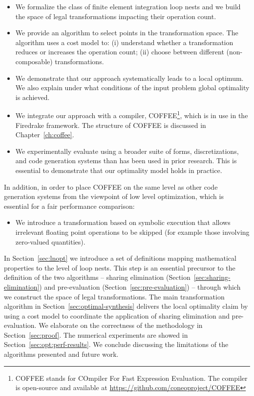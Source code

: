\begin{itemize}
\item We formalize the class of finite element integration loop nests and we build the space of legal transformations impacting their operation count.
\item We provide an algorithm to select points in the transformation space. The algorithm uses a cost model to: (i) understand whether a transformation reduces or increases the operation count; (ii) choose between different (non-composable) transformations.
\item We demonstrate that our approach systematically leads to a local optimum. We also explain under what conditions of the input problem global optimality is achieved.
\item We integrate our approach with a compiler, COFFEE\footnote{COFFEE stands for COmpiler For Fast Expression Evaluation. The compiler is open-source and available at \url{https://github.com/coneoproject/COFFEE}}, which is in use in the Firedrake framework. The structure of COFFEE is discussed in Chapter~\ref{ch:coffee}.
\item We experimentally evaluate using a broader suite of forms, discretizations, and code generation systems than has been used in prior research. This is essential to demonstrate that our optimality model holds in practice.
\end{itemize}

In addition, in order to place COFFEE on the same level as other code generation systems from the viewpoint of low level optimization, which is essential for a fair performance comparison:

\begin{itemize}
\item We introduce a transformation based on symbolic execution that allows irrelevant floating point operations to be skipped (for example those involving zero-valued quantities).
\end{itemize}

In Section~\ref{sec:lnopt} we introduce a set of definitions mapping mathematical properties to the level of loop nests. This step is an essential precursor to the definition of the two algorithms -- sharing elimination (Section~\ref{sec:sharing-elimination}) and pre-evaluation (Section~\ref{sec:pre-evaluation}) -- through which we construct the space of legal transformations. The main transformation algorithm in Section~\ref{sec:optimal-synthesis} delivers the local optimality claim by using a cost model to coordinate the application of sharing elimination and pre-evaluation. We elaborate on the correctness of the methodology in Section~\ref{sec:proof}. The numerical experiments are showed in Section~\ref{sec:opt:perf-results}. We conclude discussing the limitations of the algorithms presented and future work. 


